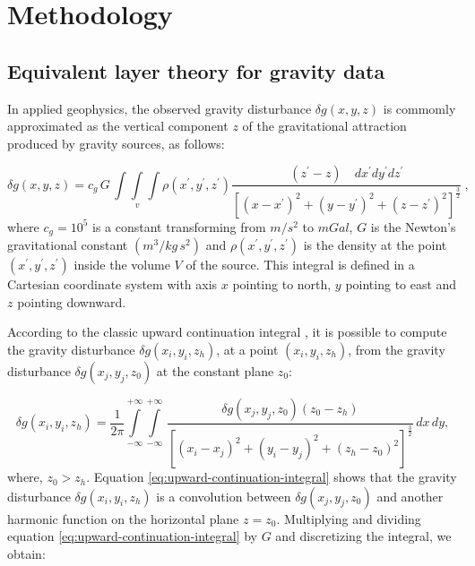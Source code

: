 \documentclass[paper]{geophysics}
\begin{document}
\section*{Methodology}
\subsection{Equivalent layer theory for gravity data}
In applied geophysics, the observed gravity disturbance $\delta g(x, y, z)$ \citep{heiskanen1967physical} is commomly approximated as the vertical component $z$ of the gravitational attraction produced by gravity sources, as follows:

\begin{equation}
\delta g(x, y, z) = c_{g} \, G \, \int\int\limits_{v}\int \rho(x^{\prime}, y^{\prime}, z^{\prime}) \frac{(z^{\prime} - z) \quad dx^{\prime}dy^{\prime}dz^{\prime}}{[(x - x^{\prime})^{2} + (y - y^{\prime})^{2} + (z - z^{\prime})^{2}]^{\frac{3}{2}}}\: ,
\label{eq:gravity-disturbance}
\end{equation}
where $c_{g} = 10^5$ is a constant transforming from $m/s^2$ to $mGal$, $G$ is the Newton's gravitational constant $(m^3/kg \, s^2)$ and $\rho(x^{\prime}, y^{\prime}, z^{\prime})$ is the density at the point $(x^{\prime}, y^{\prime}, z^{\prime})$ inside the volume $V$ of the source. This integral is defined in a Cartesian coordinate system with axis $x$ pointing to north, $y$ pointing to east and $z$ pointing downward.

According to the classic upward continuation integral \citep{henderson1960comprehensive, henderson1970validity}, it is possible to compute the gravity disturbance $\delta g(x_{i}, y_{i}, z_{h})$, at a point $(x_i, y_i, z_h)$, from the gravity disturbance $\delta g(x_j, y_j, z_{0})$ at the constant plane $z_{0}$:

\begin{equation}
\delta g(x_i, y_i, z_h) = \frac{1}{2\pi}  \int\limits_{-\infty}^{+\infty} \int\limits_{-\infty}^{+\infty} \,
\frac{\delta g(x_j, y_j, z_0) (z_{0} - z_{h})}{\left[(x_{i} - x_j)^{2} +
	(y_{i} - y_j)^{2} +
	(z_{h} - z_{0})^{2} \right]^{\frac{3}{2}}} \, 
dx \, dy,
\label{eq:upward-continuation-integral}
\end{equation}
where, $z_0 > z_h$.
Equation \ref{eq:upward-continuation-integral} shows that the gravity disturbance $\delta g(x_{i}, y_{i}, z_{h})$ is a convolution between $\delta g(x_j, y_j, z_{0})$ and another harmonic function on the horizontal plane $z=z_0$.
Multiplying and dividing equation \ref{eq:upward-continuation-integral} by $G$ and discretizing the integral, we obtain:
\end{document}
